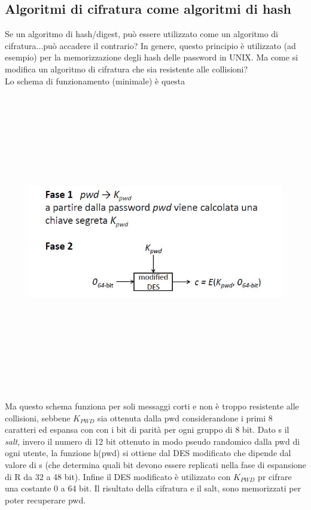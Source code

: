 \subsection{Algoritmi di cifratura come algoritmi di hash}
Se un algoritmo di hash/digest, può essere utilizzato come un algoritmo di cifratura...può accadere il contrario?
In genere, questo principio è utilizzato (ad esempio) per la memorizzazione degli hash delle password in UNIX.
Ma come si modifica un algoritmo di cifratura che sia resistente alle collisioni?\\
Lo schema di funzionamento (minimale) è questa
\begin{figure}
	\begin{center}
	{\includegraphics[height=13cm, width=13cm, keepaspectratio]{Immagini/Capitolo4/schema_des_come_hash.JPG}}
	\end{center}
\end{figure}
Ma questo schema funziona per soli messaggi corti e non è troppo resistente alle collisioni, sebbene $K_{PWD}$ sia ottenuta dalla pwd considerandone i primi 8 caratteri ed espansa con con i bit di parità per ogni gruppo di 8 bit.
Dato s il \textit{salt}, invero il numero di 12 bit ottenuto in modo pseudo randomico dalla pwd di ogni utente, la funzione h(pwd) si ottiene dal DES modificato che dipende dal valore di s (che determina quali bit  devono essere replicati nella fase di espansione di R da 32 a 48 bit). Infine il DES modificato è utilizzato con $K_{PWD}$ pr cifrare una costante 0 a 64 bit. Il risultato della cifratura e il salt, sono memorizzati per poter recuperare pwd.

